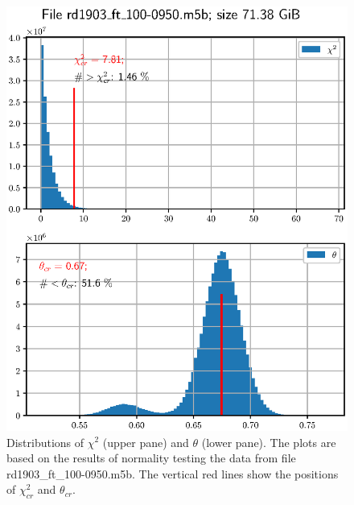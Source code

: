\documentclass[letterpaper,twoside,12pt]{article}
\begin{document}
\begin{figure}[ht!]
  \begin{center}
  \includegraphics[width=35pc]{fig_chi2_and_thresh_distr_1.eps}
  \caption{\small Distributions of $\chi^2$ (upper pane) and $\theta$ (lower pane). The plots are based on the results of normality testing the data from file rd1903\_ft\_100-0950.m5b. The vertical red lines show the positions of $\chi^2_{cr}$ and $\theta_{cr}$. }
  \label{chi2_and_thresh_distr_1}
  \end{center}
\end{figure}
\end{document}
